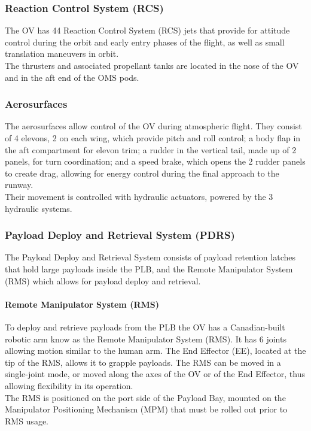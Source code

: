 \documentclass[Space_Shuttle_Vessel_Manual.tex]{subfiles}
\begin{document}
\begin{multicols*}{2}
\subsubsection{Reaction Control System (RCS)}
The OV has 44 Reaction Control System (RCS) jets that provide for attitude control during the orbit and early entry phases of the flight, as well as small translation maneuvers in orbit.\\
The thrusters and associated propellant tanks are located in the nose of the OV and in the aft end of the OMS pods.


\subsubsection{Aerosurfaces}
The aerosurfaces allow control of the OV during atmospheric flight. They consist of 4 elevons, 2 on each wing, which provide pitch and roll control; a body flap in the aft compartment for elevon trim; a rudder in the vertical tail, made up of 2 panels, for turn coordination; and a speed brake, which opens the 2 rudder panels to create drag, allowing for energy control during the final approach to the runway.\\
Their movement is controlled with hydraulic actuators, powered by the 3 hydraulic systems.


\subsubsection{Payload Deploy and Retrieval System (PDRS)}
The Payload Deploy and Retrieval System consists of payload retention latches that hold large payloads inside the PLB, and the Remote Manipulator System (RMS) which allows for payload deploy and retrieval.

\paragraph{Remote Manipulator System (RMS)}
To deploy and retrieve payloads from the PLB the OV has a Canadian-built robotic arm know as the Remote Manipulator System (RMS). It has 6 joints allowing motion similar to the human arm. The End Effector (EE), located at the tip of the RMS, allows it to grapple payloads. The RMS can be moved in a single-joint mode, or moved along the axes of the OV or of the End Effector, thus allowing flexibility in its operation.\\
The RMS is positioned on the port side of the Payload Bay, mounted on the Manipulator Positioning Mechanism (MPM) that must be rolled out prior to RMS usage.



\end{multicols*}
\end{document}
